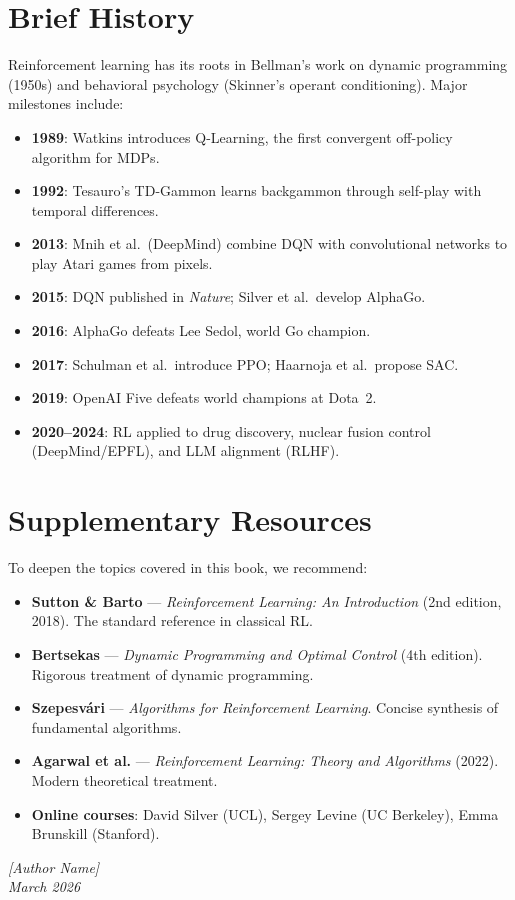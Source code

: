 \section*{Brief History}

Reinforcement learning has its roots in Bellman's work on dynamic programming
(1950s) and behavioral psychology (Skinner's operant conditioning). Major
milestones include:

\begin{itemize}
    \item \textbf{1989}: Watkins introduces Q-Learning, the first convergent
    off-policy algorithm for MDPs.
    \item \textbf{1992}: Tesauro's TD-Gammon learns backgammon through self-play
    with temporal differences.
    \item \textbf{2013}: Mnih et al.\ (DeepMind) combine DQN with convolutional
    networks to play Atari games from pixels.
    \item \textbf{2015}: DQN published in \emph{Nature}; Silver et al.\ develop
    AlphaGo.
    \item \textbf{2016}: AlphaGo defeats Lee Sedol, world Go champion.
    \item \textbf{2017}: Schulman et al.\ introduce PPO; Haarnoja et al.\ propose SAC.
    \item \textbf{2019}: OpenAI Five defeats world champions at Dota~2.
    \item \textbf{2020--2024}: RL applied to drug discovery, nuclear fusion control
    (DeepMind/EPFL), and LLM alignment (RLHF).
\end{itemize}

\section*{Supplementary Resources}

To deepen the topics covered in this book, we recommend:

\begin{itemize}
    \item \textbf{Sutton \& Barto} --- \emph{Reinforcement Learning: An Introduction}
    (2nd edition, 2018). The standard reference in classical RL.

    \item \textbf{Bertsekas} --- \emph{Dynamic Programming and Optimal Control}
    (4th edition). Rigorous treatment of dynamic programming.

    \item \textbf{Szepesv\'ari} --- \emph{Algorithms for Reinforcement Learning}.
    Concise synthesis of fundamental algorithms.

    \item \textbf{Agarwal et al.} --- \emph{Reinforcement Learning: Theory and
    Algorithms} (2022). Modern theoretical treatment.

    \item \textbf{Online courses}: David Silver (UCL), Sergey Levine (UC Berkeley),
    Emma Brunskill (Stanford).
\end{itemize}

\vfill

\begin{flushright}
\textit{[Author Name]} \\
\textit{March 2026}
\end{flushright}
